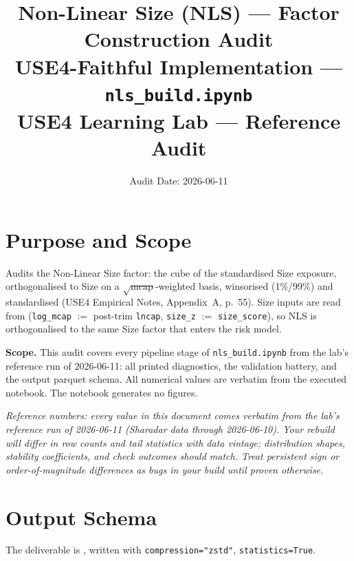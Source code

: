 \documentclass[11pt,a4paper]{article}
\title{\textbf{Non-Linear Size (NLS) --- Factor Construction Audit}\\[2pt]
\large USE4-Faithful Implementation --- \texttt{nls\_build.ipynb}\\[4pt]
\normalsize USE4 Learning Lab --- Reference Audit}
\author{Audit Date: 2026-06-11}
\date{}
\newcommand{\NOTE}[1]{\textcolor{note}{\textit{#1}}}
\begin{document}
\maketitle
\tableofcontents
\newpage

\section{Purpose and Scope}

Audits the Non-Linear Size factor: the cube of the standardised
Size exposure, orthogonalised to Size on a $\sqrt{\text{mcap}}$-weighted basis,
winsorised (1\%/99\%) and standardised (USE4 Empirical Notes, Appendix~A, p.~55).
Size inputs are read from  (\texttt{log\_mcap} $:=$
post-trim \texttt{lncap}, \texttt{size\_z} $:=$ \texttt{size\_score}), so NLS is
orthogonalised to the same Size factor that enters the risk model.

\smallskip
\textbf{Scope.} This audit covers every pipeline stage of
\texttt{nls\_build.ipynb} from the lab's reference run of 2026-06-11: all printed diagnostics, the
validation battery, and the output parquet schema. All numerical values are
verbatim from the executed notebook. The notebook generates no figures.

\NOTE{Reference numbers: every value in this document comes verbatim from the lab's reference run of 2026-06-11 (Sharadar data through 2026-06-10). Your rebuild will differ in row counts and tail statistics with data vintage; distribution shapes, stability coefficients, and check outcomes should match. Treat persistent sign or order-of-magnitude differences as bugs in your build until proven otherwise.}


\section{Output Schema}

The deliverable is , written with
\texttt{compression="zstd"}, \newline\texttt{statistics=True}.
\end{document}
